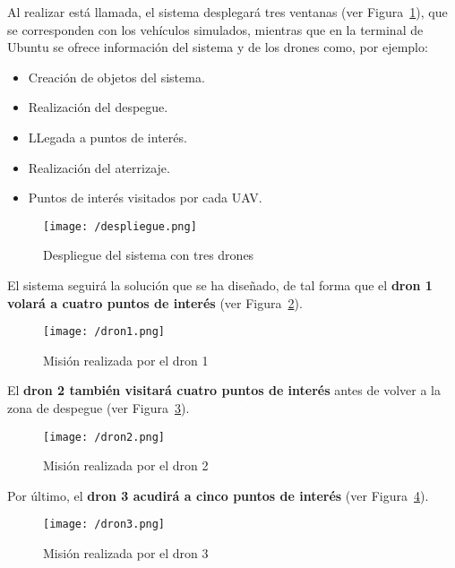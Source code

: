 Al realizar está llamada, el sistema desplegará tres ventanas (ver Figura~\ref{fig:despliegue}), que se corresponden con los vehículos simulados, mientras que en la terminal de Ubuntu se ofrece información del sistema y de los drones como, por ejemplo: 
\begin{itemize}
\item Creación de objetos del sistema.
\item Realización del despegue.
\item LLegada a puntos de interés.
\item Realización del aterrizaje.
\item Puntos de interés visitados por cada \acs{UAV}.
\end{itemize}

\begin{figure}[!h]
\begin{center}
\texttt{[image: /despliegue.png]}
\caption[Despliegue del sistema con tres drones]{Despliegue del sistema con tres drones}
\label{fig:despliegue}
\end{center}
\end{figure}

El sistema seguirá la solución que se ha diseñado, de tal forma que el \textbf{dron 1 volará a cuatro puntos de interés} (ver Figura~\ref{fig:dron1}).

\begin{figure}[!h]
\begin{center}
\texttt{[image: /dron1.png]}
\caption[Misión realizada por el dron 1]{Misión realizada por el dron 1}
\label{fig:dron1}
\end{center}
\end{figure}

El \textbf{dron 2 también visitará cuatro puntos de interés} antes de volver a la zona de despegue (ver Figura~\ref{fig:dron2}).

\begin{figure}[!h]
\begin{center}
\texttt{[image: /dron2.png]}
\caption[Misión realizada por el dron 2]{Misión realizada por el dron 2}
\label{fig:dron2}
\end{center}
\end{figure}

Por último, el \textbf{dron 3 acudirá a cinco puntos de interés} (ver Figura~\ref{fig:dron3}).

\begin{figure}[!h]
\begin{center}
\texttt{[image: /dron3.png]}
\caption[Misión realizada por el dron 3]{Misión realizada por el dron 3}
\label{fig:dron3}
\end{center}
\end{figure}

